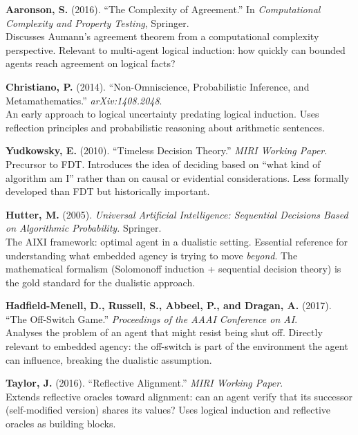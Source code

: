 \documentclass[11pt,a4paper]{article}
\theoremstyle{definition}
\theoremstyle{remark}
\begin{document}
\begin{enumerate}[label={[\arabic*]},leftmargin=2em]
\item \label{bib:aaronson2016} \textbf{Aaronson, S.} (2016). ``The
  Complexity of Agreement.'' In \textit{Computational Complexity and
  Property Testing}, Springer.\\
  Discusses Aumann's agreement theorem from a computational complexity
  perspective.  Relevant to multi-agent logical induction: how quickly
  can bounded agents reach agreement on logical facts?

\item \label{bib:christiano2014} \textbf{Christiano, P.} (2014).
  ``Non-Omniscience, Probabilistic Inference, and Metamathematics.''
  \textit{arXiv:1408.2048}.\\
  An early approach to logical uncertainty predating logical induction.
  Uses reflection principles and probabilistic reasoning about
  arithmetic sentences.

\item \label{bib:yudkowsky2010} \textbf{Yudkowsky, E.} (2010).
  ``Timeless Decision Theory.'' \textit{MIRI Working Paper}.\\
  Precursor to FDT.  Introduces the idea of deciding based on
  ``what kind of algorithm am I'' rather than on causal or evidential
  considerations.  Less formally developed than FDT but historically
  important.

\item \label{bib:hutter2005} \textbf{Hutter, M.} (2005). \textit{Universal
  Artificial Intelligence: Sequential Decisions Based on Algorithmic
  Probability.}  Springer.\\
  The AIXI framework: optimal agent in a dualistic setting.  Essential
  reference for understanding what embedded agency is trying to move
  \emph{beyond}.  The mathematical formalism (Solomonoff induction +
  sequential decision theory) is the gold standard for the dualistic
  approach.

\item \label{bib:hadfield2017} \textbf{Hadfield-Menell, D., Russell,
  S., Abbeel, P., and Dragan, A.} (2017). ``The Off-Switch Game.''
  \textit{Proceedings of the AAAI Conference on AI}.\\
  Analyses the problem of an agent that might resist being shut off.
  Directly relevant to embedded agency: the off-switch is part of the
  environment the agent can influence, breaking the dualistic
  assumption.

\item \label{bib:taylor2016} \textbf{Taylor, J.} (2016). ``Reflective
  Alignment.'' \textit{MIRI Working Paper}.\\
  Extends reflective oracles toward alignment: can an agent verify
  that its successor (self-modified version) shares its values?  Uses
  logical induction and reflective oracles as building blocks.


\end{enumerate}
\end{document}
